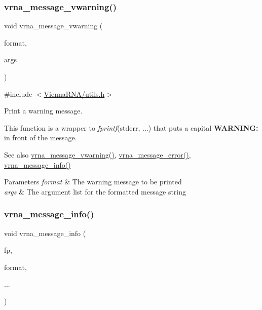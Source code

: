 \subsubsection{\texorpdfstring{vrna\+\_\+message\+\_\+vwarning()}{vrna\_message\_vwarning()}}
{\footnotesize\ttfamily void vrna\+\_\+message\+\_\+vwarning (\begin{DoxyParamCaption}\item[{const char $\ast$}]{format,  }\item[{va\+\_\+list}]{args }\end{DoxyParamCaption})}



{\ttfamily \#include $<$\hyperlink{utils_8h}{Vienna\+R\+N\+A/utils.\+h}$>$}



Print a warning message. 

This function is a wrapper to {\itshape fprintf}(stderr, ...) that puts a capital {\bfseries W\+A\+R\+N\+I\+NG\+:} in front of the message.

\begin{DoxySeeAlso}{See also}
\hyperlink{group__utils_ga377aa8ec8a49d343063adb22e6311f26}{vrna\+\_\+message\+\_\+vwarning()}, \hyperlink{group__utils_ga36b35be01d7f36cf7f59c245eee628d1}{vrna\+\_\+message\+\_\+error()}, \hyperlink{group__utils_ga039bae6153a6415b054dbe6045f83d03}{vrna\+\_\+message\+\_\+info()}
\end{DoxySeeAlso}

\begin{DoxyParams}{Parameters}
{\em format} & The warning message to be printed \\
\hline
{\em args} & The argument list for the formatted message string \\
\hline
\end{DoxyParams}
\mbox{\label{group__utils_ga039bae6153a6415b054dbe6045f83d03}} 
\subsubsection{\texorpdfstring{vrna\+\_\+message\+\_\+info()}{vrna\_message\_info()}}
{\footnotesize\ttfamily void vrna\+\_\+message\+\_\+info (\begin{DoxyParamCaption}\item[{F\+I\+LE $\ast$}]{fp,  }\item[{const char $\ast$}]{format,  }\item[{}]{... }\end{DoxyParamCaption})}



